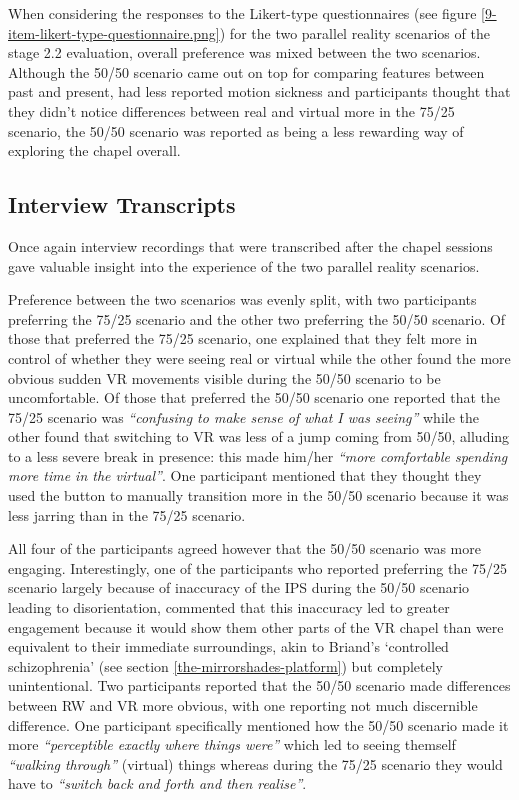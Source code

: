 When considering the responses to the Likert-type questionnaires (see figure \ref{9-item-likert-type-questionnaire.png}) for the two parallel reality scenarios of the stage 2.2 evaluation, overall preference was mixed between the two scenarios. Although the 50/50 scenario came out on top for comparing features between past and present, had less reported motion sickness and participants thought that they didn't notice differences between real and virtual more in the 75/25 scenario, the 50/50 scenario was reported as being a less rewarding way of exploring the chapel overall.


\subsection{Interview Transcripts}

Once again interview recordings that were transcribed after the chapel sessions gave valuable insight into the experience of the two parallel reality scenarios.

Preference between the two scenarios was evenly split, with two participants preferring the 75/25 scenario and the other two preferring the 50/50 scenario. Of those that preferred the 75/25 scenario, one explained that they felt more in control of whether they were seeing real or virtual while the other found the more obvious sudden VR movements visible during the 50/50 scenario to be uncomfortable. Of those that preferred the 50/50 scenario one reported that the 75/25 scenario was \textit{``confusing to make sense of what I was seeing''} while the other found that switching to VR was less of a jump coming from 50/50, alluding to a less severe break in presence: this made him/her \textit{``more comfortable spending more time in the virtual''}. One participant mentioned that they thought they used the button to manually transition more in the 50/50 scenario because it was less jarring than in the 75/25 scenario.

All four of the participants agreed however that the 50/50 scenario was more engaging. Interestingly, one of the participants who reported preferring the 75/25 scenario largely because of inaccuracy of the IPS during the 50/50 scenario leading to disorientation, commented that this inaccuracy led to greater engagement because it would show them other parts of the VR chapel than were equivalent to their immediate surroundings, akin to Briand's `controlled schizophrenia' (see section \ref{the-mirrorshades-platform}) but completely unintentional. Two participants reported that the 50/50 scenario made differences between RW and VR more obvious, with one reporting not much discernible difference. One participant specifically mentioned how the 50/50 scenario made it more \textit{``perceptible exactly where things were''} which led to seeing themself \textit{``walking through''} (virtual) things whereas during the 75/25 scenario they would have to \textit{``switch back and forth and then realise''}.

